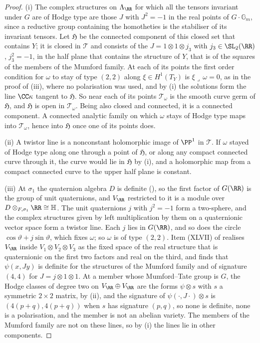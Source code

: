 \begin{proof}
(i) The complex structures on $\Lambda_{\RR}$ for which all the tensors
invariant under $G$ are of Hodge type are those $J$ with $J^{2}=-1$ in the
real points of $G\cdot\mathbb{G}_{m}$, since a reductive group containing the
homotheties is the stabiliser of its invariant tensors. Let $\mathfrak{H}$ be
the connected component of this closed set that contains $Y$; it is closed in
$\mathcal{T}$ and consists of the $J=1\otimes1\otimes j_{3}$ with
$j_{3}\in\SL_{2}(\RR)$, $j_{3}^{2}=-1$, in the half plane that contains the
structure of $Y$, that is of the squares of the members of the Mumford
family. At each of its points the
first order condition for $\omega$ to stay of type $(2,2)$ along
$\xi\in H^{1}(T_{Y})$ is $\xi\lrcorner\,\omega=0$, as in the proof of
(iii), where no polarisation was used, and by
(i) the solutions form the line $\CC\kappa$ tangent to
$\mathfrak{H}$. So near each of its points $\mathcal{T}_{\omega}$ is the smooth
curve germ of $\mathfrak{H}$, and $\mathfrak{H}$ is open in
$\mathcal{T}_{\omega}$. Being also closed and connected, it is a connected
component. A connected analytic family on which $\omega$ stays of Hodge type
maps into $\mathcal{T}_{\omega}$, hence into $\mathfrak{H}$ once one of its
points does.

(ii) A twistor line is a nonconstant holomorphic image of $\PP^{1}$ in
$\mathcal{T}$. If $\omega$ stayed of Hodge type along one through a point of
$\mathfrak{H}$, or along any compact connected curve through it, the curve
would lie in $\mathfrak{H}$ by (i), and a holomorphic map from a compact
connected curve to the upper half plane is constant.

(iii) At $\sigma_{1}$ the quaternion algebra $D$ is definite
(), so the first factor of $G(\RR)$ is the group of unit
quaternions, and $V_{\RR}$ restricted to it is a module over
$D\otimes_{F,\sigma_{1}}\RR\cong\mathbb{H}$. The unit quaternions $j$ with
$j^{2}=-1$ form a two-sphere, and the complex structures given by left
multiplication by them on a quaternionic vector space form a twistor line.
Each $j$ lies in $G(\RR)$, and so does the circle $\cos\vartheta+j\sin\vartheta$,
which fixes $\omega$; so $\omega$ is of type $(2,2)$. Item (XLVII) of
 realises $V_{\RR}$ inside $V_{1}\otimes V_{2}
\otimes V_{3}$ as the fixed space of the real structure that is quaternionic on
the first two factors and real on the third, and finds that $\psi(x,Jy)$ is
definite for the structures of the Mumford family and of signature $(4,4)$ for
$J=j\otimes1\otimes1$. At a member whose Mumford--Tate group is $G$, the Hodge
classes of degree two on $V_{\RR}\oplus V_{\RR}$ are the forms $\psi\otimes s$
with $s$ a symmetric $2\times2$ matrix, by (ii), and
the signature of $\psi(\cdot,J\cdot)\otimes s$ is $(4(p+q),4(p+q))$ when $s$ has
signature $(p,q)$, so none is definite, none is a polarisation, and the member
is not an abelian variety. The members of the Mumford family are not on these
lines, so by (i) the lines lie in other components.
\end{proof}


